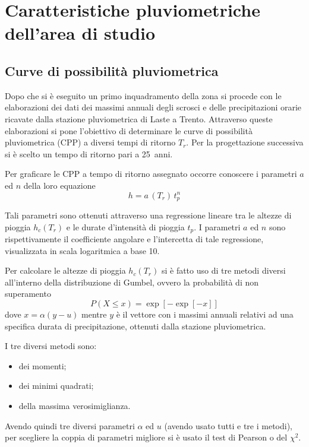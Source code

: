 \chapter{Caratteristiche pluviometriche dell’area di studio}\label{cap:pluviometriche}
\section{Curve di possibilità pluviometrica}
Dopo che si è eseguito un primo inquadramento della zona si procede con le elaborazioni dei dati dei massimi annuali degli scrosci e delle precipitazioni orarie ricavate dalla stazione pluviometrica di Laste a Trento.
Attraverso queste elaborazioni si pone l'obiettivo di determinare le curve di possibilità pluviometrica (CPP) a diversi tempi di ritorno $T_r$.
Per la progettazione successiva si è scelto un tempo di ritorno pari a \SI{25}{anni}. 

Per graficare le CPP a tempo di ritorno assegnato occorre conoscere i parametri $a$ ed $n$ della loro equazione
\begin{equation}
    \label{eq:CPP}
    h = a\,(T_r) \, t_p ^{n}
\end{equation}

Tali parametri sono ottenuti attraverso una regressione lineare tra le altezze di pioggia $h_c (T_r)$ e le durate d'intensità di pioggia $t_p$. 
I parametri $a$ ed $n$ sono rispettivamente il coefficiente angolare e l'intercetta di tale regressione, visualizzata in scala logaritmica a base 10. 

Per calcolare le altezze di pioggia $h_c (T_r)$ si è fatto uso di tre metodi diversi all'interno della distribuzione di Gumbel, ovvero la probabilità di non superamento 
\begin{equation}
  P(X\leq x) = \exp{\left[-\exp{\left[-x \right]} \right]}
\end{equation}
 dove $x = \alpha ( y - u)$ mentre $y$ è il vettore con i massimi annuali relativi ad una specifica durata di precipitazione, ottenuti dalla stazione pluviometrica.

I tre diversi metodi sono:
\begin{itemize}
\item dei momenti;
\item dei minimi quadrati;
\item della massima verosimiglianza.
\end{itemize}
Avendo quindi tre diversi parametri $\alpha$ ed $u$ (avendo usato tutti e tre i metodi), per scegliere la coppia di parametri migliore si è usato il test di Pearson o del $\chi ^2$.

